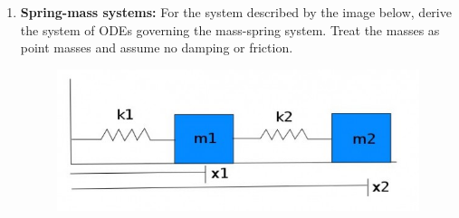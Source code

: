 \documentclass[letterpaper, fontsize=10pt]{scrartcl} %
\numberwithin{equation}{section} %
\numberwithin{figure}{section} %
\numberwithin{table}{section} %
\begin{document}
\begin{enumerate}
\begin{enumerate}[label=(\alph*)]
\end{enumerate}




\item \textbf{Spring-mass systems:} For the system described by the image below, derive the system of ODEs governing the mass-spring system. Treat the masses as point masses and assume no damping or friction.
\begin{figure}[H]
\centering \includegraphics[width=0.8\columnwidth]{mass-spring.jpg}
\end{figure}


\end{enumerate}
\end{document}
